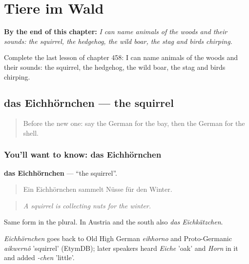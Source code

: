 
\chapter{Tiere im Wald}
\label{ch:ge-tiere-im-wald}

\begin{chapteropening}
\textbf{By the end of this chapter:} \emph{I can name animals of the woods and their sounds: the squirrel, the hedgehog, the wild boar, the stag and birds chirping.}

Complete the last lesson of chapter 458: I can name animals of the woods and their sounds: the squirrel, the hedgehog, the wild boar, the stag and birds chirping.
\end{chapteropening}

\section[das Eichhörnchen]{das Eichhörnchen — the squirrel}

\label{lesson:GE-C458-eichhoernchen}



\begin{quote}
Before the new one: say the German for the bay, then the German for the shell.
\end{quote}

\subsection*{You'll want to know: das Eichhörnchen}
\textbf{das Eichhörnchen} — \textquotedblleft{}the squirrel\textquotedblright{}.

\begin{quote}
Ein Eichhörnchen sammelt Nüsse für den Winter.
\end{quote}

\begin{quote}
\emph{A squirrel is collecting nuts for the winter.}
\end{quote}

Same form in the plural. In Austria and the south also \emph{das Eichkätzchen}.

\begin{cousinweb}
\emph{Eichhörnchen} goes back to Old High German \emph{eihhorno} and Proto-Germanic \emph{aikwernô} 'squirrel' (EtymDB); later speakers heard \emph{Eiche} 'oak' and \emph{Horn} in it and added \emph{-chen} 'little'.
\end{cousinweb}

